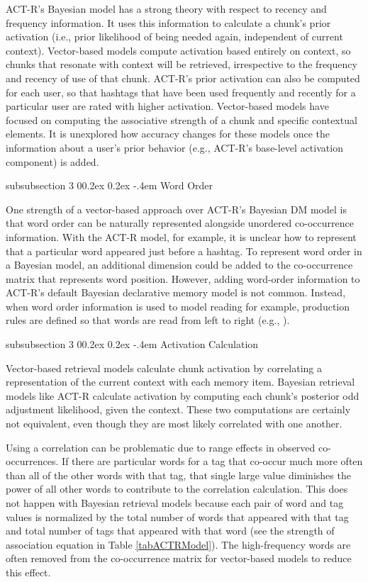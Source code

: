 \documentclass[man,floatsintext,donotrepeattitle]{apa6}
\makeatletter
\renewcommand{\subsubsection}{%
  \@startsection
  {subsubsection}%
  {3}%
  {\parindent}%
  {0\baselineskip \@plus 0.2ex \@minus 0.2ex}%
  {-.4em}%
  {\normalfont\normalsize\bfseries\addperi}}
\makeatother
\begin{document}
ACT-R's Bayesian model has a strong theory with respect to recency and frequency information.
It uses this information to calculate a chunk's prior activation (i.e., prior likelihood of being needed again, independent of current context).
Vector-based models compute activation based entirely on context, so chunks that resonate with context will be retrieved, irrespective to the frequency and recency of use of that chunk.
ACT-R's prior activation can also be computed for each user, so that hashtags that have been used frequently and recently for a particular user are rated with higher activation.
Vector-based models have focused on computing the associative strength of a chunk and specific contextual elements.
It is unexplored how accuracy changes for these models once the information about a user's prior behavior (e.g., ACT-R's base-level activation component) is added.

\subsubsection{Word Order}

One strength of a vector-based approach over ACT-R's Bayesian DM model is that word order can be naturally represented alongside unordered co-occurrence information.
With the ACT-R model, for example, it is unclear how to represent that a particular word appeared just before a hashtag. 
To represent word order in a Bayesian model, an additional dimension could be added to the co-occurrence matrix that represents word position.
However, adding word-order information to ACT-R's default Bayesian declarative memory model is not common.
Instead, when word order information is used to model reading for example, production rules are defined so that words are read from left to right (e.g., ).

\subsubsection{Activation Calculation}

Vector-based retrieval models calculate chunk activation by correlating a representation of the current context with each memory item.
Bayesian retrieval models like ACT-R calculate activation by computing each chunk's posterior odd adjustment likelihood, given the context.
These two computations are certainly not equivalent, even though they are most likely correlated with one another.

Using a correlation can be problematic due to range effects in observed co-occurrences.
If there are particular words for a tag that co-occur much more often than all of the other words with that tag, that single large value diminishes the power of all other words to contribute to the correlation calculation.
This does not happen with Bayesian retrieval models because each pair of word and tag values is normalized by the total number of words that appeared with that tag and total number of tags that appeared with that word
(see the strength of association equation in Table \ref{tabACTRModel}).
The high-frequency words are often removed from the co-occurrence matrix for vector-based models to reduce this effect.
\end{document}

